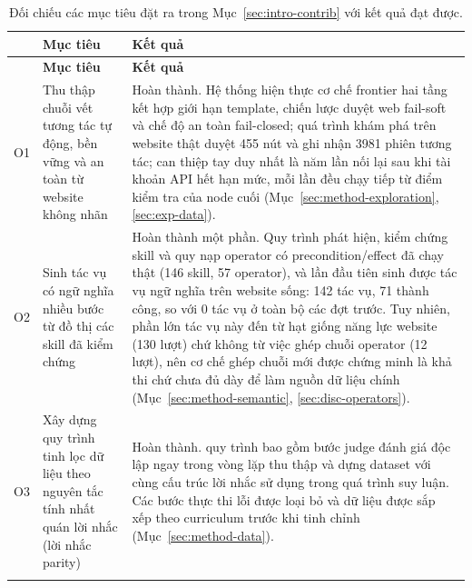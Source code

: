 \small
\begin{longtable}{@{}L{1.0cm} L{4.6cm} L{7.4cm}@{}}
  \caption[Mục tiêu của khóa luận và kết quả đạt được]{Đối chiếu các mục tiêu
  đặt ra trong Mục~\ref{sec:intro-contrib} với kết quả đạt được.}
  \label{tab:objectives}\\
  \toprule
  & \textbf{Mục tiêu} & \textbf{Kết quả} \\
  \midrule
  \endfirsthead
  \toprule
  & \textbf{Mục tiêu} & \textbf{Kết quả} \\
  \midrule
  \endhead
  \bottomrule
  \endfoot

  O1 &
  Thu thập chuỗi vết tương tác tự động, bền vững và an toàn từ website không nhãn &
  Hoàn thành. Hệ thống hiện thực cơ chế frontier hai tầng kết hợp giới hạn
  template, chiến lược duyệt web fail-soft và chế độ an toàn fail-closed;
  quá trình khám phá trên website thật duyệt 455 nút và ghi nhận 3981 phiên tương tác; can thiệp tay duy nhất là năm lần nối lại sau khi tài khoản API hết
  hạn mức, mỗi lần đều chạy tiếp từ điểm kiểm tra của node cuối
  (Mục~\ref{sec:method-exploration}, \ref{sec:exp-data}). \\

  \addlinespace

  O2 &
  Sinh tác vụ có ngữ nghĩa nhiều bước từ đồ thị các skill đã kiểm chứng &
  Hoàn thành một phần. Quy trình phát hiện, kiểm chứng skill và quy nạp
  operator có precondition/effect đã chạy thật (146 skill, 57 operator), và
  lần đầu tiên sinh được tác vụ ngữ nghĩa trên website sống: 142 tác vụ, 71 thành
  công, so với 0 tác vụ ở toàn bộ các đợt trước. Tuy nhiên, phần lớn tác vụ này
  đến từ hạt giống năng lực website (130 lượt) chứ không từ việc ghép chuỗi
  operator (12 lượt), nên cơ chế ghép chuỗi mới được chứng minh là khả thi
  chứ chưa đủ dày để làm nguồn dữ liệu chính
  (Mục~\ref{sec:method-semantic}, \ref{sec:disc-operators}). \\

  \addlinespace

  O3 &
  Xây dựng quy trình tinh lọc dữ liệu theo nguyên tắc tính nhất quán lời nhắc (lời nhắc parity) &
  Hoàn thành. quy trình bao gồm bước judge đánh giá độc lập ngay trong vòng lặp
  thu thập và dựng dataset với cùng cấu trúc lời nhắc sử dụng trong quá trình
  suy luận. Các bước thực thi lỗi được loại bỏ và dữ liệu được sắp xếp theo
  curriculum trước khi tinh chỉnh
  (Mục~\ref{sec:method-data}). \\

  \addlinespace


\end{longtable}
